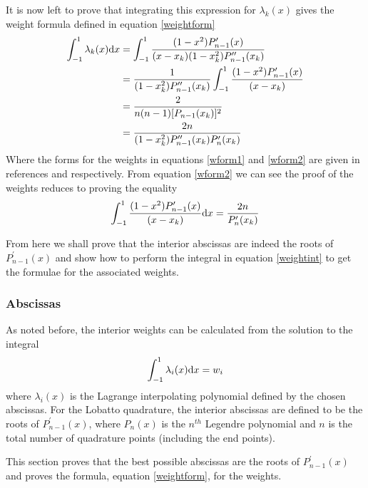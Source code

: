 It is now left to prove that integrating this expression for $\lambda_k(x)$ gives
the weight formula defined in equation \ref{weightform}
\begin{align}
\int_{-1}^{1} \lambda_k(x){\rm d}x & = \int_{-1}^{1} \frac{(1-x^2)P^\prime_{n-1}(x)}{(x-x_k)(1-x_k^2)P_{n-1}^{\prime\prime}(x_k)} \nonumber \\
 & = \frac{1}{(1-x_k^2)P^{\prime\prime}_{n-1}(x_k)} \int_{-1}^{1} \frac{(1-x^2)P^\prime_{n-1}(x)}{(x-x_k)} \nonumber \\
\label{wform1}
 & = \frac{2}{n(n-1)[P_{n-1}(x_k)]^2} \\
\label{wform2}
 & = \frac{2n}{(1-x_k^2)P^{\prime\prime}_{n-1}(x_k)P^\prime_n(x_k)} 
\end{align}
Where the forms for the weights in equations \ref{wform1}  and \ref{wform2} are given in references
\cite{ABRW-STGN} and \cite{LobattoQuad} respectively. 
From equation \ref{wform2} we can see the proof of the weights reduces to proving the equality
\begin{equation}
\label{weightint}
\int_{-1}^{1} \frac{(1-x^2)P^\prime_{n-1}(x)}{(x-x_k)}{\rm d}x = \frac{2n}{P^\prime_n(x_k)}
\end{equation}

From here we shall prove that the interior abscissas are indeed the roots of $P_{n-1}^\prime(x)$
and show how to perform the integral in equation \ref{weightint} to get the formulae for 
the associated weights.

\subsubsection{Abscissas}
As noted before, the interior weights can be calculated from the solution
to the integral
\begin{equation}
\int_{-1}^{1} \lambda_i(x){\rm d}x = w_i
\end{equation}
where $\lambda_i(x)$ is the Lagrange interpolating polynomial defined by the 
chosen abscissas. For the Lobatto quadrature, the interior abscissas are defined
to be the roots of $P^\prime_{n-1}(x)$, where $P_n(x)$ is the $n^{th}$ Legendre 
polynomial and $n$ is the total number of quadrature points (including the end points). 

This section proves that the best possible abscissas are the roots of $P^\prime_{n-1}(x)$
and proves the formula, equation \ref{weightform}, for the weights. 

